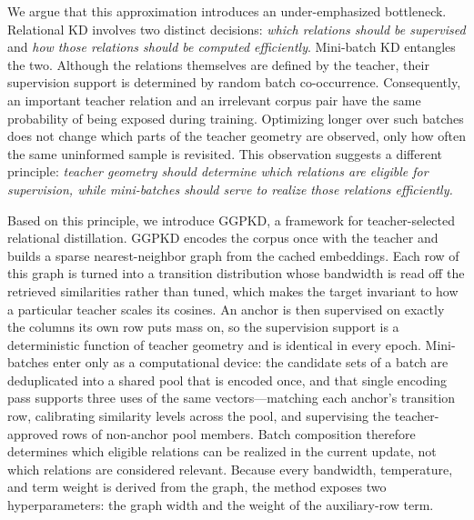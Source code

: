 We argue that this approximation introduces an under-emphasized bottleneck.
Relational KD involves two distinct decisions: \emph{which relations should be
supervised} and \emph{how those relations should be computed efficiently}.
Mini-batch KD entangles the two. Although the relations themselves are defined
by the teacher, their supervision support is determined by random batch
co-occurrence. Consequently, an important teacher relation and an irrelevant
corpus pair have the same probability of being exposed during training.
Optimizing longer over such batches does not change which parts of the teacher
geometry are observed, only how often the same uninformed sample is revisited.
This observation suggests a different principle: \emph{teacher geometry should
determine which relations are eligible for supervision, while mini-batches
should serve to realize those relations efficiently.}

Based on this principle, we introduce \textsc{GGPKD}, a framework for
teacher-selected relational distillation. GGPKD encodes the corpus once with
the teacher and builds a sparse nearest-neighbor graph from the cached
embeddings. Each row of this graph is turned into a transition distribution
whose bandwidth is read off the retrieved similarities rather than tuned, which
makes the target invariant to how a particular teacher scales its cosines. An
anchor is then supervised on exactly the columns its own row puts mass on, so
the supervision support is a deterministic function of teacher geometry and is
identical in every epoch. Mini-batches enter only as a computational device:
the candidate sets of a batch are deduplicated into a shared pool that is
encoded once, and that single encoding pass supports three uses of the same
vectors---matching each anchor's transition row, calibrating similarity levels
across the pool, and supervising the teacher-approved rows of non-anchor pool
members. Batch composition therefore determines which eligible relations can be
realized in the current update, not which relations are considered relevant.
Because every bandwidth, temperature, and term weight is derived from the
graph, the method exposes two hyperparameters: the graph width and the weight
of the auxiliary-row term.

